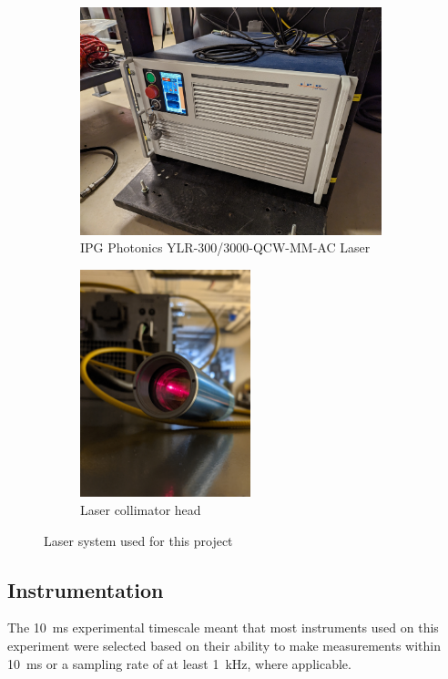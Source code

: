             \begin{figure}[h]
                \centering
                \begin{subfigure}[t]{0.6\textwidth}
                    \centering
                    \includegraphics[height=2.6in]{assets/3 design/laser.jpg}
                    \caption{IPG Photonics YLR-300/3000-QCW-MM-AC Laser}
                    \label{fig:laser_laser}
                \end{subfigure}
                \begin{subfigure}[t]{0.35\textwidth}
                    \centering
                    \includegraphics[height=2.6in]{assets/3 design/collimator_r.jpg}
                    \caption{Laser collimator head}
                    \label{fig:laser_collimator}
                \end{subfigure}
                \caption{Laser system used for this project}
                \label{fig:laser}
            \end{figure}

        \subsection{Instrumentation}
            The 10~ms experimental timescale meant that most instruments used on this experiment were selected based on their ability to make measurements within 10~ms or a sampling rate of at least \qty{1}{kHz}, where applicable.    

